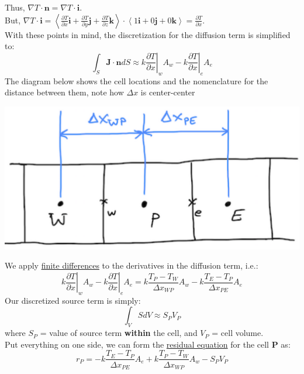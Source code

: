 \documentclass[11pt]{article}
\begin{document}
Thus, \(\nabla T \cdot \textbf{n} = \nabla T \cdot \textbf{i}\).\\
But, \(\nabla T \cdot \textbf{i} = \left < \frac{\partial T}{\partial x} \textbf{i} + \frac{\partial T}{\partial y} \textbf{j} + \frac{\partial T}{\partial z} \textbf{k}
  \right > \cdot \left <1 \textbf{i} + 0 \textbf{j} + 0 \textbf{k}    \right> = \frac{\partial T}{\partial x}\). \\
With these points in mind, the discretization for the diffusion term is simplified to:
\begin{equation}
\int_S \textbf{J} \cdot \textbf{n} dS \approx k \left .\frac{\partial T}{\partial x}\right|_w A_w
- k \left .\frac{\partial T}{\partial x}\right|_e A_e 
\end{equation}
The diagram below shows the cell locations and the nomenclature for the distance between them, note how \(\Delta x\) is center-center
\begin{center}
\includegraphics[scale=0.2]{pic/heat1D_cell.png}
\end{center}
We apply \uline{finite differences} to the derivatives in the diffusion term, i.e.:
\begin{equation}
k \left .\frac{\partial T}{\partial x}\right|_w A_w - k \left .\frac{\partial T}{\partial x}\right|_e A_e
= k\frac{T_P-T_W}{\Delta x_{WP}}A_w - k\frac{T_E-T_P}{\Delta x_{PE}}A_e
\end{equation}
Our discretized source term is simply:
\begin{equation}
\int_V SdV \approx S_PV_P
\end{equation}
where \(S_P\) = value of source term \textbf{within} the cell, and \(V_P\) = cell volume.\\
Put everything on one side, we can form the \uline{residual equation} for the cell \(\textbf{P}\) as:
\begin{equation}
r_P = - k\frac{T_E-T_P}{\Delta x_{PE}}A_e + k\frac{T_P-T_W}{\Delta x_{WP}}A_w - S_PV_P
\end{equation}
\end{document}
